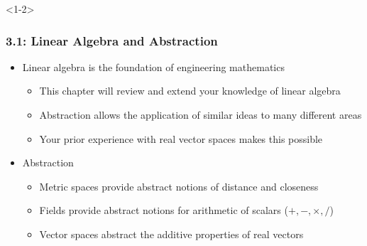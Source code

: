 \documentclass[10pt,english,aspectratio=169]{beamer}
\begin{document}
\begin{frame}<1-2> \frametitle{3.1: Linear Algebra and Abstraction}

\begin{itemize}
\setlength\itemsep{5mm}
\item<1-> Linear algebra is the foundation of engineering mathematics \vspace{1mm}
  \begin{itemize}
  \setlength\itemsep{1.5mm}
  \item This chapter will review and extend your knowledge of linear algebra
  \item Abstraction allows the application of similar ideas to many different areas
  \item Your prior experience with real vector spaces makes this possible 
  \end{itemize}
\item<2-> Abstraction \vspace{1mm}
  \begin{itemize}
  \setlength\itemsep{1.5mm}
  \item Metric spaces provide abstract notions of distance and closeness
  \item Fields provide abstract notions for arithmetic of scalars ($+,-,\times,/$)
  \item Vector spaces abstract the additive properties of real vectors
  \end{itemize}
\end{itemize}


\end{frame}
\end{document}
